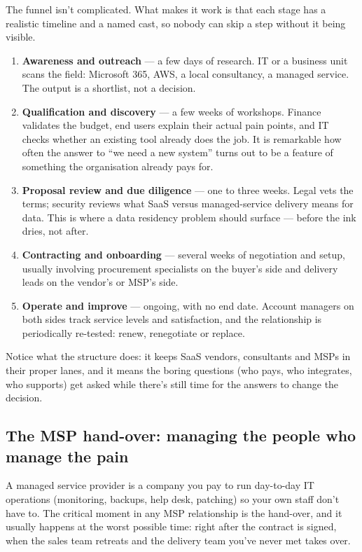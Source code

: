 The funnel isn't complicated. What makes it work is that each stage has a realistic timeline and a named cast, so nobody can skip a step without it being visible.


\begin{enumerate}[leftmargin=*]
\item \textbf{Awareness and outreach} — a few days of research. IT or a business unit scans the field: Microsoft 365, AWS, a local consultancy, a managed service. The output is a shortlist, not a decision.
\item \textbf{Qualification and discovery} — a few weeks of workshops. Finance validates the budget, end users explain their actual pain points, and IT checks whether an existing tool already does the job. It is remarkable how often the answer to ``we need a new system'' turns out to be a feature of something the organisation already pays for.
\item \textbf{Proposal review and due diligence} — one to three weeks. Legal vets the terms; security reviews what SaaS versus managed-service delivery means for data. This is where a data residency problem should surface — before the ink dries, not after.
\item \textbf{Contracting and onboarding} — several weeks of negotiation and setup, usually involving procurement specialists on the buyer's side and delivery leads on the vendor's or MSP's side.
\item \textbf{Operate and improve} — ongoing, with no end date. Account managers on both sides track service levels and satisfaction, and the relationship is periodically re-tested: renew, renegotiate or replace.
\end{enumerate}

Notice what the structure does: it keeps SaaS vendors, consultants and MSPs in their proper lanes, and it means the boring questions (who pays, who integrates, who supports) get asked while there's still time for the answers to change the decision.



\subsection{The MSP hand-over: managing the people who manage the pain}


A managed service provider is a company you pay to run day-to-day IT operations (monitoring, backups, help desk, patching) so your own staff don't have to. The critical moment in any MSP relationship is the hand-over, and it usually happens at the worst possible time: right after the contract is signed, when the sales team retreats and the delivery team you've never met takes over.


